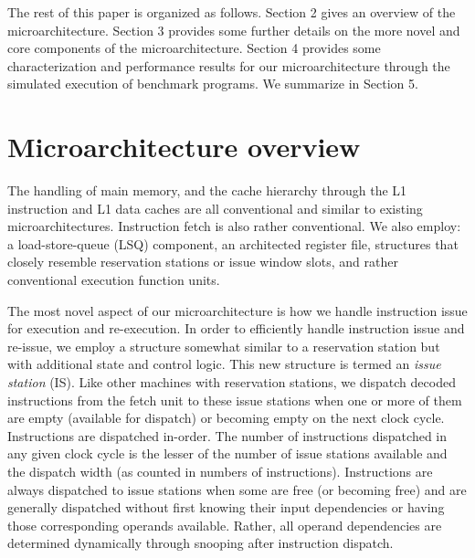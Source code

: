 \documentclass[10pt,twocolumn,dvips]{article}
\begin{document}
The rest of this paper is organized as follows.
Section 2 gives an overview of the microarchitecture.
Section 3 provides some further details on the more
novel and core components of the microarchitecture.
Section 4 provides some characterization and performance 
results for our microarchitecture through the simulated
execution of benchmark programs.
We summarize in Section 5.
%
\vspace{-0.15in}
\section{Microarchitecture overview}
%
The handling of main memory, and the cache hierarchy 
through the L1 instruction and L1 data caches are all
conventional and similar to existing microarchitectures.
Instruction fetch is also rather conventional.
We also employ: a
load-store-queue (LSQ) component, an architected register file,
structures that closely resemble reservation stations or issue
window slots, and rather conventional execution function units.

The most novel aspect of our microarchitecture is how we
handle instruction issue for execution and re-execution.
In order to efficiently handle instruction issue and re-issue,
we employ a structure somewhat similar to
a reservation station but with additional state and control
logic.  
This new structure is termed
an \textit{issue station} (IS).
Like other machines with reservation stations, we dispatch 
decoded instructions from the fetch unit to these issue stations
when one or more of them are empty (available for dispatch) or 
becoming empty on the next clock cycle.  
Instructions are dispatched in-order.
The number of instructions dispatched in any 
given clock cycle is
the lesser of the number of issue stations available and the
dispatch width (as counted in numbers of instructions).
Instructions are always dispatched to issue stations when
some are free (or becoming free) and are generally dispatched
without first knowing their input dependencies or having those
corresponding operands available.
Rather, all operand dependencies are determined dynamically through
snooping after instruction dispatch.
\end{document}
